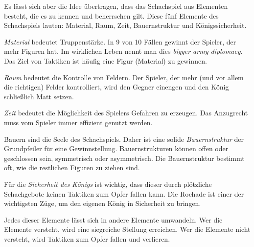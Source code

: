 \documentclass[
  a4paper,
  justified,
  nobib,
]{tufte-handout}
\begin{document}
Es lässt sich aber die Idee übertragen, dass das Schachspiel aus Elementen besteht, die es
zu kennen und beherrschen gilt. Diese fünf Elemente des Schachspiels lauten: Material,
Raum, Zeit, Bauernstruktur und Königssicherheit.
\begin{marginfigure}
  \begin{center}
  \end{center}
\end{marginfigure}
\emph{Material} bedeutet Truppenstärke. In 9 von 10 Fällen gewinnt der Spieler, der mehr
Figuren hat. Im wirklichen Leben nennt man dies \emph{bigger army diplomacy}. Das Ziel von
Taktiken ist häufig eine Figur (Material) zu gewinnen.

\emph{Raum} bedeutet die Kontrolle von Feldern. Der Spieler, der mehr (und vor allem die
richtigen) Felder kontrolliert, wird den Gegner einengen und den König schließlich Matt
setzen.

\emph{Zeit} bedeutet die Möglichkeit des Spielers Gefahren zu erzeugen. Das Anzugrecht
muss vom Spieler immer effizient genutzt werden.

Bauern sind die Seele des Schachspiels. Daher ist eine solide \emph{Bauernstruktur} der
Grundpfeiler für eine Gewinnstellung. Bauernstrukturen können offen oder geschlossen sein,
symmetrisch oder asymmetrisch. Die Bauernstruktur bestimmt oft, wie die restlichen Figuren
zu ziehen sind.

Für die \emph{Sicherheit des Königs} ist wichtig, dass dieser durch plötzliche
Schachgebote keinen Taktiken zum Opfer fallen kann. Die Rochade ist einer der wichtigsten
Züge, um den eigenen König in Sicherheit zu bringen.

Jedes dieser Elemente lässt sich in andere Elemente umwandeln.
Wer die Elemente versteht, wird eine siegreiche Stellung erreichen.
Wer die Elemente nicht versteht, wird Taktiken zum Opfer fallen und verlieren.
\end{document}
